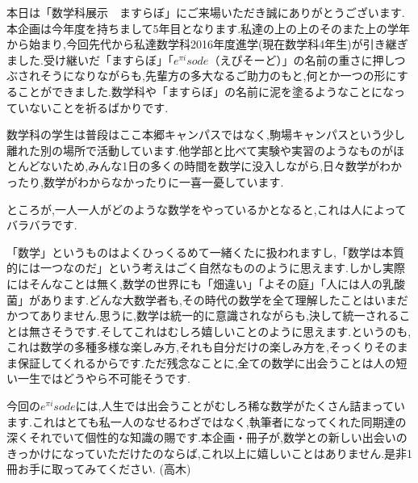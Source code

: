本日は「数学科展示　ますらぼ」にご来場いただき誠にありがとうございます.本企画は今年度を持ちまして5年目となります.私達の上の上のそのまた上の学年から始まり,今回先代から私達数学科2016年度進学(現在数学科4年生)が引き継ぎました.受け継いだ「ますらぼ」「$e^{\pi i}sode$（えぴそーど）」の名前の重さに押しつぶされそうになりながらも,先輩方の多大なるご助力のもと,何とか一つの形にすることができました.数学科や「ますらぼ」の名前に泥を塗るようなことになっていないことを祈るばかりです.

数学科の学生は普段はここ本郷キャンパスではなく,駒場キャンパスという少し離れた別の場所で活動しています.他学部と比べて実験や実習のようなものがほとんどないため,みんな1日の多くの時間を数学に没入しながら,日々数学がわかったり,数学がわからなかったりに一喜一憂しています.

ところが,一人一人がどのような数学をやっているかとなると,これは人によってバラバラです.

「数学」というものはよくひっくるめて一緒くたに扱われますし,「数学は本質的には一つなのだ」という考えはごく自然なもののように思えます.しかし実際にはそんなことは無く,数学の世界にも「畑違い」「よその庭」「人には人の乳酸菌」があります.どんな大数学者も,その時代の数学を全て理解したことはいまだかつてありません.思うに,数学は統一的に意識されながらも,決して統一されることは無さそうです.そしてこれはむしろ嬉しいことのように思えます.というのも,これは数学の多種多様な楽しみ方,それも自分だけの楽しみ方を,そっくりそのまま保証してくれるからです.ただ残念なことに,全ての数学に出会うことは人の短い一生ではどうやら不可能そうです.

今回の$e^{\pi i}sode$には,人生では出会うことがむしろ稀な数学がたくさん詰まっています.これはとても私一人のなせるわざではなく,執筆者になってくれた同期達の深くそれでいて個性的な知識の賜です.本企画・冊子が,数学との新しい出会いのきっかけになっていただけたのならば,これ以上に嬉しいことはありません.是非1冊お手に取ってみてください.
(高木)
